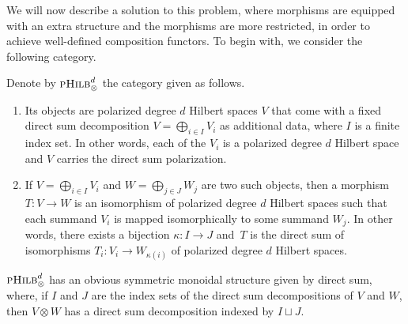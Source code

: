 \documentclass[pdftex]{sigma}
\numberwithin{equation}{section}
\newcommand{\pHilb}{\textsc{pHilb}}
\begin{document}
We will now describe a solution to this problem, where morphisms are equipped with an extra structure and the morphisms are more restricted, in order to achieve well-defined composition functors.
To begin with, we consider the following category.

\begin{Definition}
Denote by $\pHilb^d_\otimes$ the category given as follows.
\begin{enumerate}\itemsep=0pt
\item[(1)]
Its objects are polarized degree $d$ Hilbert spaces $V$ that come with a fixed direct sum decomposition $V = \bigoplus_{i \in I} V_i$ as additional data, where $I$ is a finite index set.
In other words, each of the $V_i$ is a polarized degree $d$ Hilbert space and $V$ carries the direct sum polarization.
\item[(2)]
If $V = \bigoplus_{i \in I} V_i$ and $W = \bigoplus_{j \in J} W_j$ are two such objects, then a morphism $T\colon V \to W$ is an isomorphism of polarized degree $d$ Hilbert spaces such that each summand $V_i$ is mapped isomorphically to some summand $W_j$.
In other words, there exists a bijection $\kappa\colon I \to J$ and~$T$ is the direct sum of isomorphisms $T_i \colon V_i \to W_{\kappa(i)}$ of polarized degree $d$ Hilbert spaces.
\end{enumerate}
$\pHilb^d_\otimes$ has an obvious symmetric monoidal structure given by direct sum, where, if $I$ and $J$ are the index sets of the direct sum decompositions of $V$ and $W$, then $V \otimes W$ has a direct sum decomposition indexed by $I \sqcup J$.
\end{Definition}
\end{document}
